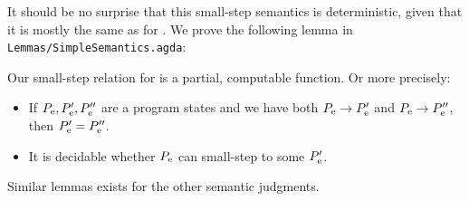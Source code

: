 It should be no surprise that this small-step semantics is deterministic, given
that it is mostly the same as for \ATAL. We prove the following lemma in
\texttt{Lemmas/SimpleSemantics.agda}:

\begin{lemma}
  \label{lemma:computsimple}
  Our small-step relation for \ATALe is a partial, computable function. Or more
  precisely:

  \begin{itemize}
  \item If $P_{\mathrm{e}}, P'_{\mathrm{e}}, P''_{\mathrm{e}}$ are a program states and we
    have both ${P_{\mathrm{e}}} -> {P'_{\mathrm{e}}}$ and
    ${P_{\mathrm{e}}} -> {P''_{\mathrm{e}}}$, then $P'_{\mathrm{e}} = P''_{\mathrm{e}}$.
  \item It is decidable whether $P_{\mathrm{e}}$ can small-step to some $P'_{\mathrm{e}}$.
  \end{itemize}

  Similar lemmas exists for the other semantic judgments.
\end{lemma}
